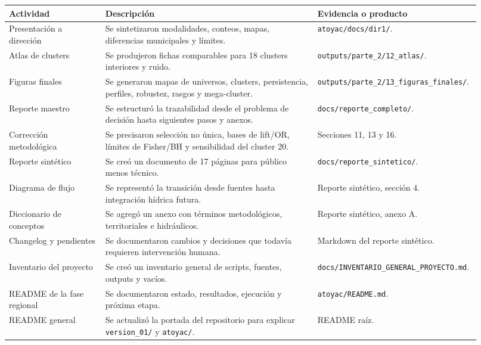\documentclass[
  spanish,
]{article}
\newcounter{none} %
\begin{document}
{\def\LTcaptype{none} %
\begin{longtable}[]{@{}p{0.20\linewidth}p{0.44\linewidth}p{0.28\linewidth}@{}}
\toprule\noalign{}
Actividad & Descripción & Evidencia o producto \\
\midrule\noalign{}
\endhead
\bottomrule\noalign{}
\endlastfoot
Presentación a dirección & Se sintetizaron modalidades, conteos, mapas,
diferencias municipales y límites. & \texttt{atoyac/docs/dir1/}. \\
Atlas de clusters & Se produjeron fichas comparables para 18 clusters
interiores y ruido. & \texttt{outputs/parte\_2/12\_atlas/}. \\
Figuras finales & Se generaron mapas de universos, clusters,
persistencia, perfiles, robustez, rasgos y mega-cluster. &
\texttt{outputs/parte\_2/13\_figuras\_finales/}. \\
Reporte maestro & Se estructuró la trazabilidad desde el problema de
decisión hasta siguientes pasos y anexos. &
\texttt{docs/reporte\_completo/}. \\
Corrección metodológica & Se precisaron selección no única, bases de
lift/OR, límites de Fisher/BH y sensibilidad del cluster 20. & Secciones
11, 13 y 16. \\
Reporte sintético & Se creó un documento de 17 páginas para público
menos técnico. & \texttt{docs/reporte\_sintetico/}. \\
Diagrama de flujo & Se representó la transición desde fuentes hasta
integración hídrica futura. & Reporte sintético, sección 4. \\
Diccionario de conceptos & Se agregó un anexo con términos
metodológicos, territoriales e hidráulicos. & Reporte sintético, anexo
A. \\
Changelog y pendientes & Se documentaron cambios y decisiones que
todavía requieren intervención humana. & Markdown del reporte
sintético. \\
Inventario del proyecto & Se creó un inventario general de scripts,
fuentes, outputs y vacíos. &
\texttt{docs/INVENTARIO\_GENERAL\_PROYECTO.md}. \\
README de la fase regional & Se documentaron estado, resultados,
ejecución y próxima etapa. & \texttt{atoyac/README.md}. \\
README general & Se actualizó la portada del repositorio para explicar
\texttt{version\_01/} y \texttt{atoyac/}. & README raíz. \\
\end{longtable}
}
\end{document}
